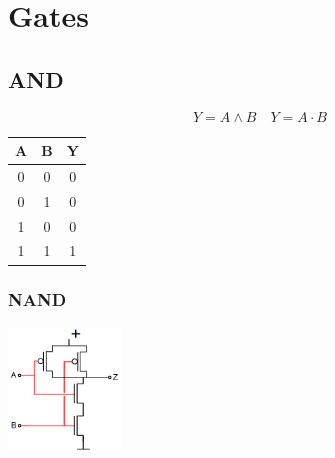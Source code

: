 \section{Gates}
\subsection{AND}
\begin{center}
    \begin{minipage}{0.55\linewidth}
        \begin{equation*}
            Y = A \land B \quad Y = A \cdot B
        \end{equation*}
        \begin{center}
        \end{center}
    \end{minipage}
    \hfill
    \begin{minipage}{0.35\linewidth}
        \begin{tabular}{|c c|c|}
            \hline
            A & B & Y\\
            \hline
            0 & 0 & 0\\
            0 & 1 & 0\\
            1 & 0 & 0\\
            1 & 1 & 1\\
            \hline
        \end{tabular}
    \end{minipage}
    \begin{minipage}[t]{0.45\linewidth}
        \subsubsection{NAND}
        \includegraphics[width = 30mm]{images/nand.png}
    \end{minipage}
    \begin{minipage}[t]{0.45\linewidth}

\end{minipage}
\end{center}
